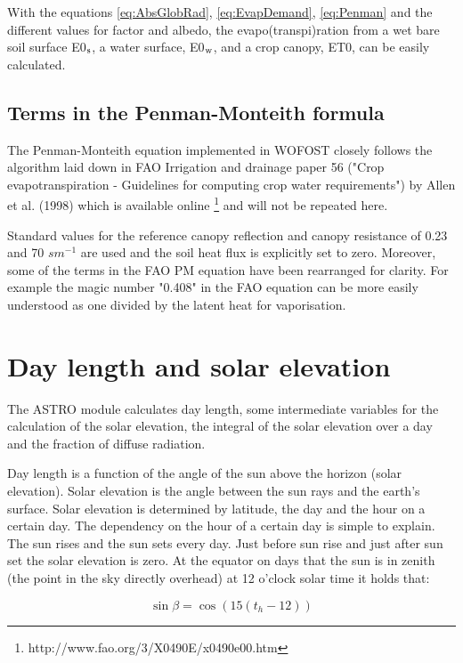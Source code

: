 With the equations \ref{eq:AbsGlobRad}, \ref{eq:EvapDemand}, \ref{eq:Penman} and the different values for factor and albedo, the evapo(transpi)ration from a wet bare soil surface E0$_{{\rm s}}$, a water surface, E0$_{{\rm w}}$, and a crop canopy, ET0, can be easily calculated.


\subsection{Terms in the Penman-Monteith formula}

The Penman-Monteith equation implemented in WOFOST closely follows the algorithm laid down in 
FAO Irrigation and drainage paper 56 ("Crop evapotranspiration - Guidelines for computing crop 
water requirements") by Allen et al. (1998) which is available online \footnote{http://www.fao.org/3/X0490E/x0490e00.htm}
and will not be repeated here.

Standard values for the reference canopy reflection and canopy resistance of 0.23 and 70 $s m^{-1}$ are used and
the soil heat flux is explicitly set to zero. Moreover, some of the terms in the FAO PM equation have been
rearranged for clarity. For example the magic number "0.408" in the FAO equation can be more easily 
understood as one divided by the latent heat for vaporisation.


\section{Day length and solar elevation}
\label{sec:daylength}

The ASTRO module calculates day length, some intermediate variables for the calculation
of the solar elevation, the integral of the solar elevation over a day and the fraction of
diffuse radiation.

Day length is a function of the angle of the sun above the horizon (solar elevation). Solar
elevation is the angle between the sun rays and the earth's surface. Solar elevation is
determined by latitude, the day and the hour on a certain day.
The dependency on the hour of a certain day is simple to explain. The sun rises and the
sun sets every day. Just before sun rise and just after sun set the solar elevation is zero. 
At the equator on days that the sun is in zenith (the point in the sky directly overhead) at 
12 o'clock solar time it holds that:

\begin{equation}
\sin \beta = \cos (15(t _{h} -12))
\end{equation}

